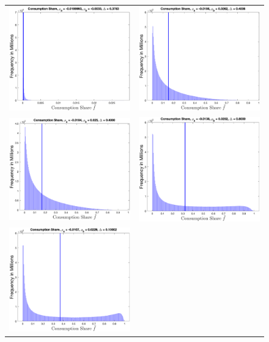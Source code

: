 \begin{figure}[H] 
\centering
\vspace{0.1in}
\begin{tabular}{cc}
\includegraphics[width=.4\textwidth]{figures/IAFigCALn1.eps} &
\includegraphics[width=.4\textwidth]{figures/IAFigCALn2.eps} \\
\includegraphics[width=.4\textwidth]{figures/IAFigCALn3.eps} &
\includegraphics[width=.4\textwidth]{figures/IAFigCALn4.eps} \\
\includegraphics[width=.4\textwidth]{figures/IAFigCALn5.eps} &

\end{tabular}
\end{figure}
